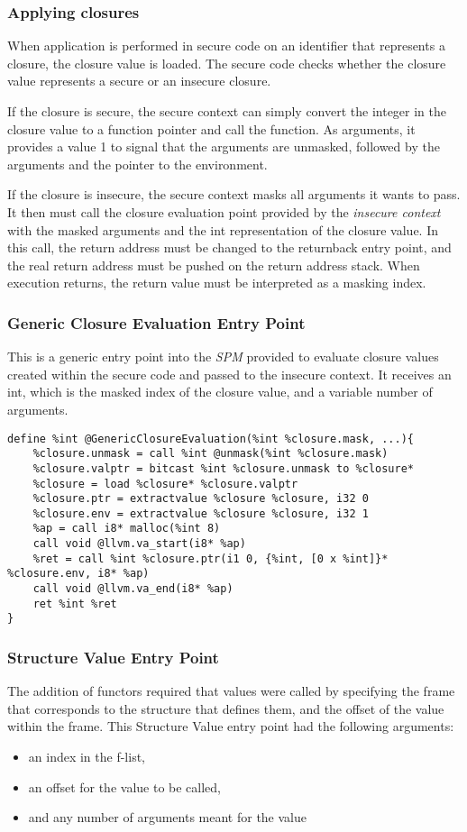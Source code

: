 \subsubsection{Applying closures}
When application is performed in secure code on an identifier that represents a closure, the closure value is loaded. The secure code checks whether the closure value represents a secure or an insecure closure.

If the closure is secure, the secure context can simply convert the integer in the closure value to a function pointer and call the function.
As arguments, it provides a value 1 to signal that the arguments are unmasked, followed by the arguments and the pointer to the environment.

If the closure is insecure, the secure context masks all arguments it wants to pass. It then must call the closure evaluation point provided by the \emph{insecure context} with the masked arguments and the int representation of the closure value.
In this call, the return address must be changed to the returnback entry point, and the real return address must be pushed on the return address stack.
When execution returns, the return value must be interpreted as a masking index.

\subsubsection{Generic Closure Evaluation Entry Point}
This is a generic entry point into the \emph{SPM} provided to evaluate closure values created within the secure code and passed to the insecure context. It receives an int, which is the masked index of the closure value, and a variable number of arguments.

\begin{lstlisting}
define %int @GenericClosureEvaluation(%int %closure.mask, ...){
    %closure.unmask = call %int @unmask(%int %closure.mask)
    %closure.valptr = bitcast %int %closure.unmask to %closure*
    %closure = load %closure* %closure.valptr
    %closure.ptr = extractvalue %closure %closure, i32 0
    %closure.env = extractvalue %closure %closure, i32 1
    %ap = call i8* malloc(%int 8)
    call void @llvm.va_start(i8* %ap)
    %ret = call %int %closure.ptr(i1 0, {%int, [0 x %int]}* %closure.env, i8* %ap)
    call void @llvm.va_end(i8* %ap)
    ret %int %ret
}
\end{lstlisting}

\subsubsection{Structure Value Entry Point}
The addition of functors required that values were called by specifying the frame that corresponds to the structure that defines them, and the offset of the value within the frame.
This Structure Value entry point had the following arguments:
\begin{itemize}
\item an index in the f-list,
\item an offset for the value to be called,
\item and any number of arguments meant for the value 
\end{itemize}


